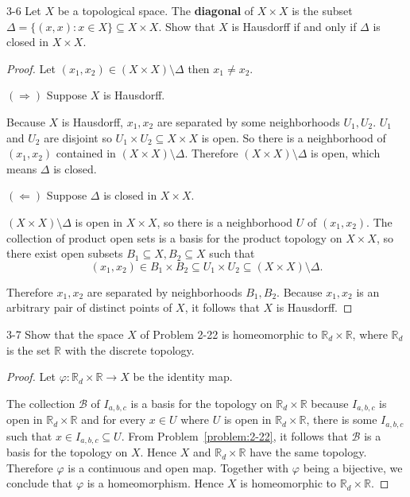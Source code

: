 \begin{problem}{3-6}
Let $X$ be a topological space. The \textbf{diagonal} of $X\times X$ is the subset $\Delta = \{ (x, x): x\in X \}\subseteq X\times X$. Show that $X$ is Hausdorff if and only if $\Delta$ is closed in $X\times X$.
\end{problem}

\begin{proof}
	Let $(x_{1}, x_{2})\in (X\times X)\setminus\Delta$ then $x_{1}\ne x_{2}$.

	$(\Rightarrow)$ Suppose $X$ is Hausdorff.

	Because $X$ is Hausdorff, $x_{1}, x_{2}$ are separated by some neighborhoods $U_{1}, U_{2}$. $U_{1}$ and $U_{2}$ are disjoint so $U_{1}\times U_{2}\subseteq X\times X$ is open. So there is a neighborhood of $(x_{1}, x_{2})$ contained in $(X\times X)\setminus\Delta$. Therefore $(X\times X)\setminus\Delta$ is open, which means $\Delta$ is closed.

	$(\Leftarrow)$ Suppose $\Delta$ is closed in $X\times X$.

	$(X\times X)\setminus\Delta$ is open in $X\times X$, so there is a neighborhood $U$ of $(x_{1}, x_{2})$. The collection of product open sets is a basis for the product topology on $X\times X$, so there exist open subsets $B_{1}\subseteq X, B_{2}\subseteq X$ such that
	\[
		(x_{1}, x_{2})\in B_{1}\times B_{2}\subseteq U_{1}\times U_{2}\subseteq (X\times X)\setminus\Delta.
	\]

	Therefore $x_{1}, x_{2}$ are separated by neighborhoods $B_{1}, B_{2}$. Because $x_{1}, x_{2}$ is an arbitrary pair of distinct points of $X$, it follows that $X$ is Hausdorff.
\end{proof}

\begin{problem}{3-7}
Show that the space $X$ of Problem 2-22 is homeomorphic to $\mathbb{R}_{d}\times\mathbb{R}$, where $\mathbb{R}_{d}$ is the set $\mathbb{R}$ with the discrete topology.
\end{problem}

\begin{proof}
	Let $\varphi: \mathbb{R}_{d}\times\mathbb{R}\to X$ be the identity map.

	The collection $\mathscr{B}$ of $I_{a,b,c}$ is a basis for the topology on $\mathbb{R}_{d}\times\mathbb{R}$ because $I_{a,b,c}$ is open in $\mathbb{R}_{d}\times\mathbb{R}$ and for every $x\in U$ where $U$ is open in $\mathbb{R}_{d}\times\mathbb{R}$, there is some $I_{a,b,c}$ such that $x\in I_{a,b,c} \subseteq U$. From Problem~\ref{problem:2-22}, it follows that $\mathscr{B}$ is a basis for the topology on $X$. Hence $X$ and $\mathbb{R}_{d}\times\mathbb{R}$ have the same topology. Therefore $\varphi$ is a continuous and open map. Together with $\varphi$ being a bijective, we conclude that $\varphi$ is a homeomorphism. Hence $X$ is homeomorphic to $\mathbb{R}_{d}\times\mathbb{R}$.
\end{proof}

